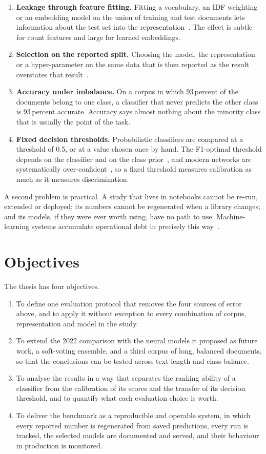 \begin{enumerate}
\item \textbf{Leakage through feature fitting.} Fitting a vocabulary, an IDF weighting or an embedding model on the union of training and test documents lets information about the test set into the representation~\cite{kaufman2012}. The effect is subtle for count features and large for learned embeddings.
\item \textbf{Selection on the reported split.} Choosing the model, the representation or a hyper-parameter on the same data that is then reported as the result overstates that result~\cite{cawley2010}.
\item \textbf{Accuracy under imbalance.} On a corpus in which 93\,percent of the documents belong to one class, a classifier that never predicts the other class is 93\,percent accurate. Accuracy says almost nothing about the minority class that is usually the point of the task.
\item \textbf{Fixed decision thresholds.} Probabilistic classifiers are compared at a threshold of 0.5, or at a value chosen once by hand. The F1-optimal threshold depends on the classifier and on the class prior~\cite{lipton2014}, and modern networks are systematically over-confident~\cite{guo2017}, so a fixed threshold measures calibration as much as it measures discrimination.
\end{enumerate}

A second problem is practical. A study that lives in notebooks cannot be re-run, extended or deployed; its numbers cannot be regenerated when a library changes; and its models, if they were ever worth using, have no path to use. Machine-learning systems accumulate operational debt in precisely this way~\cite{sculley2015}.

\section{Objectives}
The thesis has four objectives.
\begin{enumerate}
\item To define one evaluation protocol that removes the four sources of error above, and to apply it without exception to every combination of corpus, representation and model in the study.
\item To extend the 2022 comparison with the neural models it proposed as future work, a soft-voting ensemble, and a third corpus of long, balanced documents, so that the conclusions can be tested across text length and class balance.
\item To analyse the results in a way that separates the ranking ability of a classifier from the calibration of its scores and the transfer of its decision threshold, and to quantify what each evaluation choice is worth.
\item To deliver the benchmark as a reproducible and operable system, in which every reported number is regenerated from saved predictions, every run is tracked, the selected models are documented and served, and their behaviour in production is monitored.
\end{enumerate}

